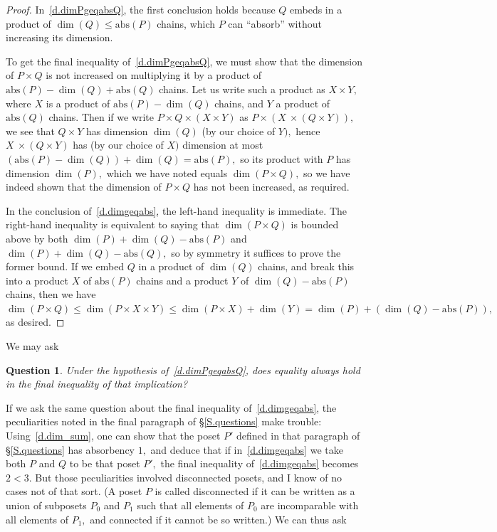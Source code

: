 \documentclass{amsart}
\newtheorem{question}[theorem]{Question}
\numberwithin{equation}{section}
\numberwithin{theorem}{section}
\renewcommand{\r}{\mathrm}
\newcommand{\abs}{\r{abs}}
\newcommand{\2}{\mathbf{2}}
\begin{document}
\begin{proof}
In~\eqref{d.dimPgeqabsQ}, the first conclusion holds
because $Q$ embeds in a product of $\dim(Q)\leq\abs(P)$ chains,
which $P$ can ``absorb'' without increasing its dimension.

To get the final inequality of~\eqref{d.dimPgeqabsQ},
we must show that the dimension
of $P\times Q$ is not increased on multiplying it by a
product of $\abs(P)-\dim(Q)+\abs(Q)$ chains.
Let us write such a product as $X\times Y,$ where
$X$ is a product of $\abs(P)-\dim(Q)$ chains,
and $Y$ a product of $\abs(Q)$ chains.
Then if we write $P\times Q\times (X\times Y)$ as
$P\times(X\ \times (Q\times Y)),$ we see that
$Q\times Y$ has dimension $\dim(Q)$ (by our choice of $Y),$ hence
$X\ \times (Q\times Y)$ has (by our choice of $X)$ dimension at most
$(\abs(P)-\dim(Q))+\dim(Q) = \abs(P),$ so its
product with $P$ has dimension $\dim(P),$ which
we have noted equals $\dim(P\times Q),$ so we have
indeed shown that the dimension
of $P\times Q$ has not been increased, as required.

In the conclusion of~\eqref{d.dimgeqabs}, the left-hand inequality
is immediate.
The right-hand inequality is equivalent to saying that $\dim(P\times Q)$
is bounded above by both $\dim(P)+\dim(Q)-\abs(P)$
and $\dim(P)+\dim(Q)-\abs(Q),$ so by symmetry it suffices to
prove the former bound.
If we embed $Q$ in a product of $\dim(Q)$ chains,
and break this into a product $X$ of $\abs(P)$ chains
and a product $Y$ of $\dim(Q)-\abs(P)$ chains, then
we have $\dim(P\times Q)\leq \dim(P\times X\times Y)\leq
\dim(P\times X) + \dim(Y) = \dim(P) + (\dim(Q)-\abs(P)),$
as desired.
\end{proof}

We may ask

\begin{question}\label{Q.abs}
Under the hypothesis of~\eqref{d.dimPgeqabsQ},
does equality always hold in the final inequality of that implication?
\end{question}

If we ask the same question about
the final inequality of~\eqref{d.dimgeqabs}, the peculiarities
noted in the final paragraph of \S\ref{S.questions} make trouble:
Using~\eqref{d.dim_sum}, one can show that the poset $P'$ defined
in that paragraph of \S\ref{S.questions} has absorbency $1,$
and deduce that if in~\eqref{d.dimgeqabs} we take both $P$ and $Q$
to be that poset $P',$ the final inequality of~\eqref{d.dimgeqabs}
becomes $2<3.$
But those peculiarities involved disconnected posets,
and I know of no cases not of that sort.
(A poset $P$ is called disconnected if it
can be written as a union of subposets
$P_0$ and $P_1$ such that all elements of
$P_0$ are incomparable with all elements of $P_1,$
and connected if it cannot be so written.)
We can thus ask
\end{document}
